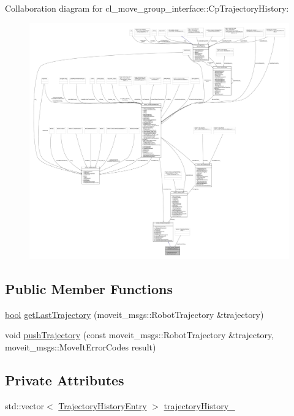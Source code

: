 Collaboration diagram for cl\+\_\+move\+\_\+group\+\_\+interface\+:\+:Cp\+Trajectory\+History\+:
\nopagebreak
\begin{figure}[H]
\begin{center}
\leavevmode
\includegraphics[width=350pt]{classcl__move__group__interface_1_1CpTrajectoryHistory__coll__graph}
\end{center}
\end{figure}
\subsection*{Public Member Functions}
\begin{DoxyCompactItemize}
\item 
\hyperlink{classbool}{bool} \hyperlink{classcl__move__group__interface_1_1CpTrajectoryHistory_aa9026698871b1e9d3ef5ee29e362802f}{get\+Last\+Trajectory} (moveit\+\_\+msgs\+::\+Robot\+Trajectory \&trajectory)
\item 
void \hyperlink{classcl__move__group__interface_1_1CpTrajectoryHistory_a27de15d0d6c5633475c59cd2ee3e7793}{push\+Trajectory} (const moveit\+\_\+msgs\+::\+Robot\+Trajectory \&trajectory, moveit\+\_\+msgs\+::\+Move\+It\+Error\+Codes result)
\end{DoxyCompactItemize}
\subsection*{Private Attributes}
\begin{DoxyCompactItemize}
\item 
std\+::vector$<$ \hyperlink{structTrajectoryHistoryEntry}{Trajectory\+History\+Entry} $>$ \hyperlink{classcl__move__group__interface_1_1CpTrajectoryHistory_ac5f17b74ca856f6f8ccb96d9a4786fb2}{trajectory\+History\+\_\+}
\end{DoxyCompactItemize}
